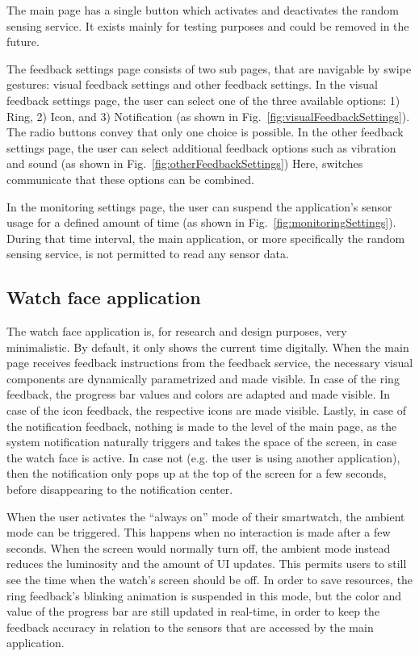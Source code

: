 \documentclass[conference, a4paper, 10pt, twocolumn]{IEEEtran}
\begin{document}
The main page has a single button which activates and deactivates the random sensing service. It exists mainly for testing purposes and could be removed in the future.

The feedback settings page consists of two sub pages, that are navigable by swipe gestures: visual feedback settings and other feedback settings. In the visual feedback settings page, the user can select one of the three available options: 1) Ring, 2) Icon, and 3) Notification (as shown in Fig.~\ref{fig:visualFeedbackSettings}). The radio buttons convey that only one choice is possible. In the other feedback settings page, the user can select additional feedback options such as vibration and sound (as shown in Fig.~\ref{fig:otherFeedbackSettings}) Here, switches communicate that these options can be combined.

In the monitoring settings page, the user can suspend the application's sensor usage for a defined amount of time (as shown in Fig.~\ref{fig:monitoringSettings}). During that time interval, the main application, or more specifically the random sensing service, is not permitted to read any sensor data. 

\subsection{\textbf{Watch face application}}\label{watchFace}
The watch face application is, for research and design purposes, very minimalistic. By default, it only shows the current time digitally. When the main page receives feedback instructions from the feedback service, the necessary visual components are dynamically parametrized and made visible. In case of the ring feedback, the progress bar values and colors are adapted and made visible. In case of the icon feedback, the respective icons are made visible. Lastly, in case of the notification feedback, nothing is made to the level of the main page, as the system notification naturally triggers and takes the space of the screen, in case the watch face is active. In case not (e.g. the user is using another application), then the notification only pops up at the top of the screen for a few seconds, before disappearing to the notification center. 

When the user activates the ``always on'' mode of their smartwatch, the ambient mode can be triggered. This happens when no interaction is made after a few seconds. When the screen would normally turn off, the ambient mode instead reduces the luminosity and the amount of \ac{UI} updates. This permits users to still see the time when the watch's screen should be off. In order to save resources, the ring feedback's blinking animation is suspended in this mode, but the color and value of the progress bar are still updated in real-time, in order to keep the feedback accuracy in relation to the sensors that are accessed by the main application.
\end{document}
